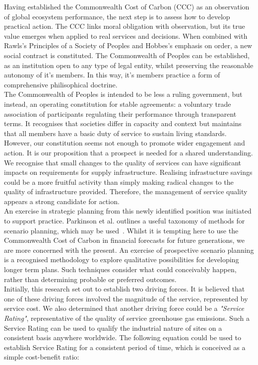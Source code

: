 \documentclass[12pt, oneside]{article}   	%
\begin{document}
Having established the Commonwealth Cost of Carbon (CCC) as an observation of global ecosystem performance, the next step is to assess how to develop practical action.
The CCC links moral obligation with observation, but its true value emerges when applied to real services and decisions.
When combined with Rawls’s Principles of a Society of Peoples and Hobbes’s emphasis on order, a new social contract is constituted.
The Commonwealth of Peoples can be established, as an institution open to any type of legal entity, whilst preserving the reasonable autonomy of it's members.
In this way, it's members practice a form of comprehensive philisophical doctrine.\\

The Commonwealth of Peoples is intended to be less a ruling government, but instead, an operating constitution for stable agreements: a voluntary trade association of participants regulating their performance through transparent terms.
It recognises that societies differ in capacity and context but maintains that all members have a basic duty of service to sustain living standards.\\

However, our constitution seems not enough to promote wider engagement and action.
It is our proposition that a prospect is needed for a shared understanding.
We recognise that small changes to the quality of services can have significant impacts on requirements for supply infrastructure.
Realising infrastucture savings could be a more fruitful activity than simply making radical changes to the quality of infrastructure provided.
Therefore, the management of service quality appears a strong candidate for action.\\

An exercise in strategic planning from this newly identified position was initiated to support practice.
Parkinson et al. outlines a useful taxonomy of methods for scenario planning, which may be used~\cite{atp1}.
Whilst it is tempting here to use the Commonwealth Cost of Carbon in financial forecasts for future generations, we are more concerned with the present.
An exercise of prospective scenario planning is a recognised methodology to explore qualitative possibilities for developing longer term plans.
Such techniques consider what could conceivably happen, rather than determining probable or preferred outcomes.\\

Initially, this research set out to establish two driving forces.
It is believed that one of these driving forces involved the magnitude of the service, represented by service cost.
We also determined that another driving force could be a \emph{"Service Rating"}, representative of the quality of service greenhouse gas emissions.
Such a Service Rating can be used to qualify the industrial nature of sites on a consistent basis anywhere worldwide.
The following equation could be used to establish Service Rating for a consistent period of time, which is conceived as a simple cost-benefit ratio:\\
\end{document}
